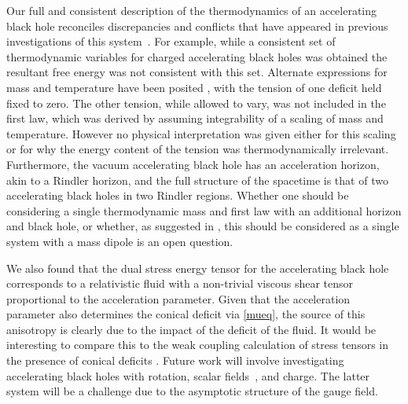 \documentclass[
twoside,
openright,
frontopenright
]{dmathesis}
\begin{document}
Our full and consistent description of the thermodynamics of an
accelerating black hole reconciles discrepancies and conflicts that have
appeared in previous investigations of this system~\cite{Appels:2016uha,
Appels:2017xoe,Astorino:2016ybm}.  For example, while a
consistent set of thermodynamic variables for charged accelerating black holes
was obtained \cite{Appels:2016uha,Appels:2017xoe,Gregory:2017ogk}
the resultant free energy was not consistent with this set.
Alternate expressions for mass and temperature have been posited
\cite{Astorino:2016ybm}, with the tension of one deficit  held fixed to zero.
The other tension, while allowed to vary, was not included in the
first law, which was derived by assuming integrability of a scaling
of mass and temperature.  However no physical interpretation was given
either for this scaling or for why the energy content of the tension was
thermodynamically irrelevant.
Furthermore, the vacuum accelerating black hole
has an acceleration horizon, akin to a Rindler horizon, and the full
structure of the spacetime is that of two accelerating black holes in
two Rindler regions. Whether one should be considering a single
thermodynamic mass and first law with an additional horizon and black hole,
or whether, as suggested in \cite{Dutta:2005iy}, this should be considered
as a single system with a mass dipole is an open question.

We also found that the dual stress energy tensor for the accelerating
black hole corresponds to a relativistic fluid with a non-trivial viscous
shear tensor proportional to the acceleration parameter. Given that
the acceleration parameter also determines the conical deficit via
\eqref{mueq}, the source of this anisotropy is clearly due to the impact
of the deficit of the fluid. It would be interesting to compare this to
the weak coupling calculation of stress tensors in the presence of
conical deficits \cite{Dowker:1977zj}.
Future work will involve investigating accelerating black holes with rotation,
scalar fields~\cite{Anabalon:2009qt, Anabalon:2012ta}, and charge. The latter
system will be a challenge due to the asymptotic structure of the gauge field.
\end{document}
